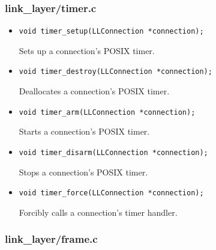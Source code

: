\documentclass[11pt,a4paper]{article}
\begin{document}
\subsubsection{link\_layer/timer.c}

\begin{itemize}
    \item \begin{lstlisting}
void timer_setup(LLConnection *connection);
    \end{lstlisting}

    Sets up a connection's POSIX timer.

    \item \begin{lstlisting}
void timer_destroy(LLConnection *connection);
    \end{lstlisting}

    Deallocates a connection's POSIX timer.

    \item \begin{lstlisting}
void timer_arm(LLConnection *connection);
    \end{lstlisting}

    Starts a connection's POSIX timer.

    \item \begin{lstlisting}
void timer_disarm(LLConnection *connection);
    \end{lstlisting}

    Stops a connection's POSIX timer.

    \item \begin{lstlisting}
void timer_force(LLConnection *connection);
    \end{lstlisting}

    Forcibly calls a connection's timer handler.
\end{itemize}

\subsubsection{link\_layer/frame.c}
\end{document}
